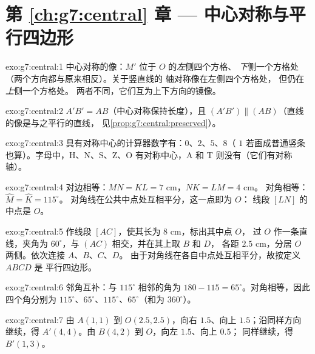 \section*{第 \ref{ch:g7:central} 章 --- 中心对称与平行四边形}

\begin{solution}{exo:g7:central:1}
中心对称的像：$M'$ 位于 $O$ 的\emph{左}侧四个方格、
\emph{下}侧一个方格处（两个方向都与原来相反）。关于竖直线的
轴对称像在左侧四个方格处，
但仍在\emph{上}侧一个方格处。
两者不同，它们互为上下方向的镜像。
\end{solution}

\begin{solution}{exo:g7:central:2}
$A'B' = AB$（中心对称保持长度），且
$(A'B') \parallel (AB)$（直线的像是与之平行的直线，
见\cref{prop:g7:central:preserved}）。
\end{solution}

\begin{solution}{exo:g7:central:3}
具有对称中心的计算器数字有：$0$、$2$、$5$、$8$（
$1$ 若画成普通竖条也算）。字母中，H、N、S、Z、O 有对称中心，A 和
T 则没有（它们有对称轴）。
\end{solution}

\begin{solution}{exo:g7:central:4}
对边相等：$MN = KL = 7$ cm，$NK = LM = 4$ cm。
对角相等：$\widehat M = \widehat K = 115^\circ$。
对角线在公共中点处互相平分，这一点即为 $O$：
线段 $[LN]$ 的中点是 $O$。
\end{solution}

\begin{solution}{exo:g7:central:5}
作线段 $[AC]$，使其长为 $8$ cm，标出其中点 $O$，
过 $O$ 作一条直线，夹角为 $60^\circ$，与 $(AC)$ 相交，并在其上取 $B$ 和 $D$，
各距 $2.5$ cm，分居 $O$ 两侧。依次连接 $A$、$B$、$C$、$D$。
由于对角线在各自中点处互相平分，故按定义 $ABCD$ 是
平行四边形。
\end{solution}

\begin{solution}{exo:g7:central:6}
邻角互补：与 $115^\circ$ 相邻的角为
$180 - 115 = 65^\circ$。对角相等，因此四个角分别为
$115^\circ$、$65^\circ$、$115^\circ$、$65^\circ$（和为
$360^\circ$）。
\end{solution}

\begin{solution}{exo:g7:central:7}
由 $A(1,1)$ 到 $O(2.5, 2.5)$，向右 $1.5$、向上 $1.5$；沿同样方向
继续，得 $A'(4, 4)$。由 $B(4,2)$ 到 $O$，向左 $1.5$、向上 $0.5$；
同样继续，得 $B'(1, 3)$。
\end{solution}

